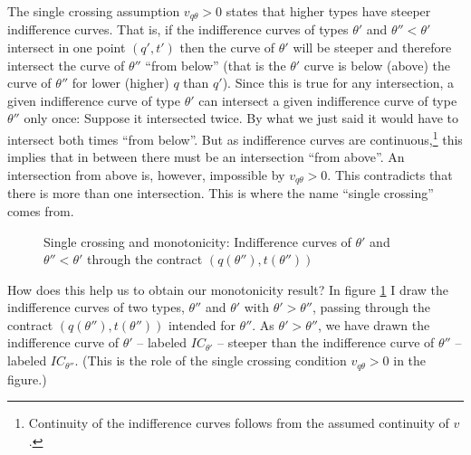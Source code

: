 \documentclass[12pt]{article}
\begin{document}
The single crossing assumption $v_{q\theta }>0$ states that higher types have steeper indifference curves. That is, if the indifference curves of types $\theta '$ and $\theta ''<\theta '$ intersect in one point $(q',t')$ then the curve of $\theta '$ will be steeper and therefore intersect the curve of $\theta ''$ ``from below'' (that is the $\theta '$ curve is below (above) the curve of $\theta ''$ for lower (higher) $q$ than $q'$). Since this is true for any intersection, a given indifference curve of type $\theta '$ can intersect a given indifference curve of type $\theta ''$ only once: Suppose it intersected twice. By what we just said it would have to  intersect both times ``from below''. But as indifference curves are continuous,\footnote{Continuity of the indifference curves follows from the assumed continuity of $v$.} this implies that in between there must be an intersection ``from above''. An intersection from above is, however, impossible by $v_{q\theta }>0$. This contradicts that there is more than one intersection. This is where the name ``single crossing'' comes from.

\begin{figure}[h]
  \centering
  \caption{Single crossing and monotonicity: Indifference curves of $\theta '$ and $\theta ''<\theta '$ through the contract $(q(\theta ''),t(\theta ''))$}
  \label{fig:mon}
\end{figure}

How does this help us to obtain our monotonicity result? In figure \ref{fig:mon} I draw the indifference curves of two types, $\theta ''$ and $\theta '$ with $\theta '>\theta ''$, passing through the contract $(q(\theta ''),t(\theta ''))$ intended for $\theta ''$. As $\theta '>\theta ''$, we have drawn the indifference curve of $\theta '$ -- labeled $IC_{\theta '}$ -- steeper than the indifference curve of $\theta ''$ -- labeled $IC_{\theta ''}$. (This is the role of the single crossing condition $v_{q\theta }>0$ in the figure.)
\end{document}
